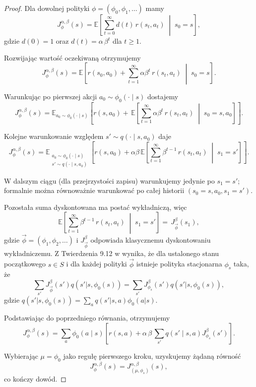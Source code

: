 \begin{proof}
Dla dowolnej polityki $\phi = (\phi_0, \phi_1, \ldots)$ mamy
\[
  J_{\phi}^{\alpha,\beta}(s) = \mathbb{E}\!\left[ \sum_{t=0}^{\infty} d(t)\, r(s_t, a_t) \;\middle|\; s_0 = s \right],
\]
gdzie $d(0) = 1$ oraz $d(t) = \alpha\,\beta^{t}$ dla $t \ge 1$.

Rozwijając wartość oczekiwaną otrzymujemy
\[
  J_{\phi}^{\alpha,\beta}(s) = \mathbb{E}\!\left[ r(s_0,a_0) + \sum_{t=1}^{\infty} \alpha \beta^{t}\, r(s_t,a_t) \;\middle|\; s_0 = s \right].
\]

Warunkując po pierwszej akcji $a_0 \sim \phi_0(\cdot \mid s)$ dostajemy
\[
  J_{\phi}^{\alpha,\beta}(s) = \mathbb{E}_{a_0 \sim \phi_0(\cdot \mid s)}\!\left[ r(s,a_0) + \,\mathbb{E}\!\left[ \sum_{t=1}^{\infty} \alpha \beta^{t}\, r(s_t,a_t) \;\middle|\; s_0 = s, a_0 \right] \right].
\]

Kolejne warunkowanie względem $s' \sim q(\cdot \mid s,a_0)$ daje
\[
  J_{\phi}^{\alpha,\beta}(s) = \mathbb{E}_{\substack{a_0 \sim \phi_0(\cdot \mid s) \\ s' \sim q(\cdot \mid s,a_0)}}\!\left[ r(s,a_0) + \alpha\beta\,\mathbb{E}\!\left[ \sum_{t=1}^{\infty} \beta^{t-1}\, r(s_t,a_t) \;\middle|\; s_1=s' \right] \right].
\]

W dalszym ciągu (dla przejrzystości zapisu) warunkujemy jedynie po $s_1=s'$; formalnie można równoważnie warunkować po całej historii $(s_0=s, a_0, s_1=s')$.

Pozostała suma dyskontowana ma postać wykładniczą, więc
\[
  \mathbb{E}\!\left[ \sum_{t=1}^{\infty} \beta^{t-1}\, r(s_t,a_t) \;\middle|\; s_1 = s' \right] = \,J_{\overrightarrow{\phi}}^{\beta}(s_1),
\]
gdzie $\overrightarrow{\phi} = (\phi_1, \phi_2, \ldots)$ i $ J^{\beta}_{\overrightarrow{\phi}}$ odpowiada klasycznemu dyskontowaniu wykładniczemu. Z Twierdzenia 9.12 w \cite{Kallenberg2022} wynika, że dla ustalonego stanu początkowego $s\in S$ i dla każdej polityki $\overrightarrow{\phi}$ istnieje polityka stacjonarna $\phi_s$ taka, że
$$\sum_{s'} J^\beta_{\overrightarrow{\phi}}(s')q(s'|s,\phi_0(s))= 
\sum_{s'}   J^\beta_{\phi_s} (s')q(s'|s,\phi_0(s)), $$
gdzie $q(s'|s,\phi_0(s))=\sum\limits_a  q(s'|s,a) \phi_0(a|s).$

Podstawiając do poprzedniego równania, otrzymujemy
\[
  J_{\phi}^{\alpha,\beta}(s) = \sum_{a}\phi_{0}(a \mid s)\!\left[ r(s,a) + \alpha\,\beta\, \sum_{s'} q(s' \mid s,a) J^{\beta}_{\phi_s}(s') \right].
\]

Wybierając $\mu = \phi_0$ jako regułę pierwszego kroku, uzyskujemy żądaną równość
\[
  J_{\phi}^{\alpha,\beta}(s) = J_{(\mu,\phi_s)}^{\alpha,\beta}(s), 
\]
co kończy dowód.
\end{proof}

